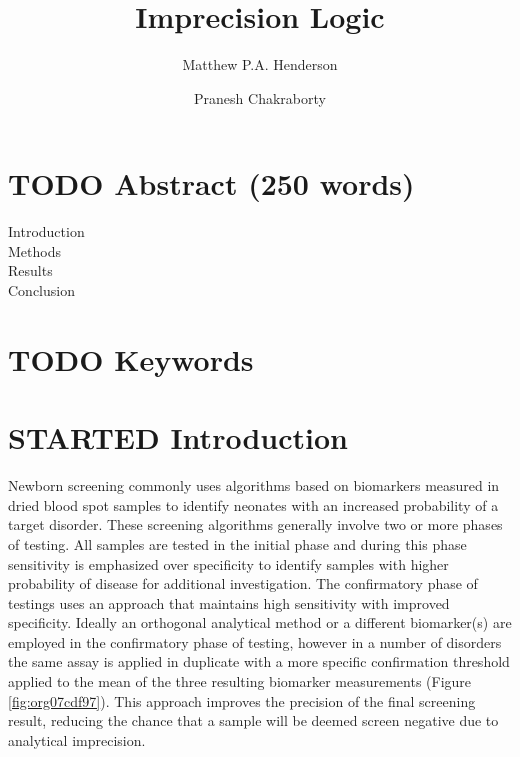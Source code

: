 \documentclass[review]{elsarticle}
\date{}
\title{}
\begin{document}
\makeatletter
\newcommand{\citeprocitem}[2]{\hyper@linkstart{cite}{citeproc_bib_item_#1}#2\hyper@linkend}
\makeatother



\begin{frontmatter}
\title{Imprecision Logic}
\author[NSO, UoO]{Matthew P.A. Henderson}
\author[NSO, UO]{Pranesh Chakraborty}
\address[NSO]{Newborn Screening Ontario, Children's Hospital of Eastern Ontario,Canada}
\address[UoO]{Department of Medicine, University of Ottawa,Canada} 
\end{frontmatter}

\section*{{\bfseries\sffamily TODO} Abstract (250 words)}
\label{sec:org8e27300}
\begin{description}
\item[{Introduction}] 

\item[{Methods}] 

\item[{Results}] 

\item[{Conclusion}] 
\end{description}
\section*{{\bfseries\sffamily TODO} Keywords}
\label{sec:orgd116f47}
\section*{{\bfseries\sffamily STARTED} Introduction}
\label{sec:org15a9216}

Newborn screening commonly uses algorithms based on biomarkers
measured in dried blood spot samples to identify neonates with an
increased probability of a target disorder. These screening algorithms
generally involve two or more phases of testing. All samples are
tested in the initial phase and during this phase sensitivity is
emphasized over specificity to identify samples with higher
probability of disease for additional investigation. The confirmatory
phase of testings uses an approach that maintains high sensitivity
with improved specificity. Ideally an orthogonal analytical method or
a different biomarker(s) are employed in the confirmatory phase of
testing, however in a number of disorders the same assay is applied in
duplicate with a more specific confirmation threshold applied to the
mean of the three resulting biomarker measurements (Figure
\ref{fig:org07cdf97}). This approach improves the precision of the final
screening result, reducing the chance that a sample will be deemed
screen negative due to analytical imprecision.
\end{document}
